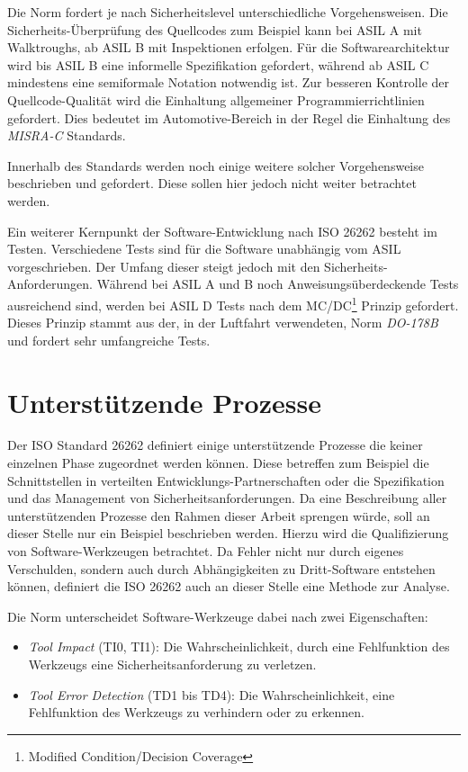 \documentclass[a4paper,DIV=calc,ngerman]{scrartcl}
\begin{document}
Die Norm fordert je nach Sicherheitslevel unterschiedliche Vorgehensweisen. Die Sicherheits-Überprüfung des Quellcodes zum Beispiel kann bei ASIL A mit Walktroughs, ab ASIL B mit Inspektionen erfolgen. Für die Softwarearchitektur wird bis ASIL B eine informelle Spezifikation gefordert, während ab ASIL C mindestens eine semiformale Notation notwendig ist. Zur besseren Kontrolle der Quellcode-Qualität wird die Einhaltung allgemeiner Programmierrichtlinien gefordert. Dies bedeutet im Automotive-Bereich in der Regel die Einhaltung des \emph{MISRA-C} Standards. 

Innerhalb des Standards werden noch einige weitere solcher Vorgehensweise beschrieben und gefordert. Diese sollen hier jedoch nicht weiter betrachtet werden. 

Ein weiterer Kernpunkt der Software-Entwicklung nach ISO 26262 besteht im Testen. Verschiedene Tests sind für die Software unabhängig vom ASIL vorgeschrieben. Der Umfang dieser steigt jedoch mit den Sicherheits-Anforderungen. Während bei ASIL A und B noch Anweisungsüberdeckende Tests ausreichend sind, werden bei ASIL D Tests nach dem MC/DC\footnote{Modified Condition/Decision Coverage} Prinzip gefordert. Dieses Prinzip stammt aus der, in der Luftfahrt verwendeten, Norm \emph{DO-178B} und fordert sehr umfangreiche Tests.






\section{Unterstützende Prozesse}
\label{sec:prozesse}
Der ISO Standard 26262 definiert einige unterstützende Prozesse die keiner einzelnen Phase zugeordnet werden können. Diese betreffen zum Beispiel die Schnittstellen in verteilten Entwicklungs-Partnerschaften oder die Spezifikation und das Management von Sicherheitsanforderungen. Da eine Beschreibung aller unterstützenden Prozesse den Rahmen dieser Arbeit sprengen würde, soll an dieser Stelle nur ein Beispiel beschrieben werden. Hierzu wird die Qualifizierung von Software-Werkzeugen betrachtet. Da Fehler nicht nur durch eigenes Verschulden, sondern auch durch Abhängigkeiten zu Dritt-Software entstehen können, definiert die ISO 26262 auch an dieser Stelle eine Methode zur Analyse.

Die Norm unterscheidet Software-Werkzeuge dabei nach zwei Eigenschaften:

\begin{itemize}
    \item \emph{Tool Impact} (TI0, TI1): Die Wahrscheinlichkeit, durch eine Fehlfunktion des Werkzeugs eine Sicherheitsanforderung zu verletzen.
    \item \emph{Tool Error Detection} (TD1 bis TD4): Die Wahrscheinlichkeit, eine Fehlfunktion des Werkzeugs zu verhindern oder zu erkennen.
\end{itemize}
\end{document}
